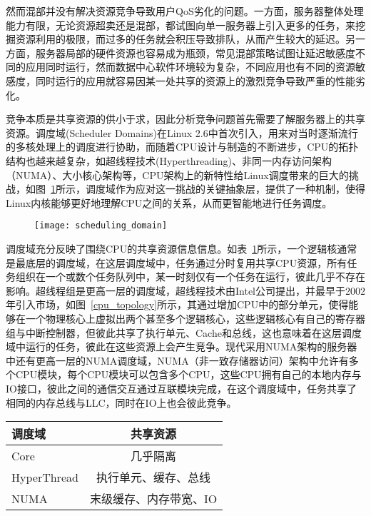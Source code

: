 然而混部并没有解决资源竞争导致用户QoS劣化的问题。一方面，服务器整体处理能力有限，无论资源超卖还是混部，都试图向单一服务器上引入更多的任务，来挖掘资源利用的极限，而过多的任务就会积压导致排队，从而产生较大的延迟。另一方面，服务器局部的硬件资源也容易成为瓶颈，常见混部策略试图让延迟敏感度不同的应用同时运行，然而数据中心软件环境较为复杂，不同应用也有不同的资源敏感度，同时运行的应用就容易因某一处共享的资源上的激烈竞争导致严重的性能劣化。

竞争本质是共享资源的供小于求，因此分析竞争问题首先需要了解服务器上的共享资源。调度域(Scheduler Domains)\citep{schedulerdomains}在Linux 2.6中首次引入，用来对当时逐渐流行的多核处理上的调度进行协助，而随着CPU设计与制造的不断进步，CPU的拓扑结构也越来越复杂，如超线程技术(Hyperthreading)、非同一内存访问架构（NUMA）、大小核心架构等，CPU架构上的新特性给Linux调度带来的巨大的挑战，如图~\ref{fig:scheduling_domain}所示，调度域作为应对这一挑战的关键抽象层，提供了一种机制，使得Linux内核能够更好地理解CPU之间的关系，从而更智能地进行任务调度。

\begin{figure}[!htbp]
    \centering
    \texttt{[image: scheduling\_domain]}
    \label{fig:scheduling_domain}
\end{figure}

调度域充分反映了围绕CPU的共享资源信息信息。如表~\ref{tab:resourcesharing}所示，一个逻辑核通常是最底层的调度域，在这层调度域中，任务通过分时复用共享CPU资源，所有任务组织在一个或数个任务队列中，某一时刻仅有一个任务在运行，彼此几乎不存在影响。超线程组是更高一层的调度域，超线程技术由Intel公司提出，并最早于2002年引入市场，如图~\ref{cpu_topology}所示，其通过增加CPU中的部分单元，使得能够在一个物理核心上虚拟出两个甚至多个逻辑核心，这些逻辑核心有自己的寄存器组与中断控制器，但彼此共享了执行单元、Cache和总线，这也意味着在这层调度域中运行的任务，彼此在这些资源上会产生竞争。现代采用NUMA架构的服务器中还有更高一层的NUMA调度域，NUMA（非一致存储器访问）架构中允许有多个CPU模块，每个CPU模块可以包含多个CPU，这些CPU拥有自己的本地内存与IO接口，彼此之间的通信交互通过互联模块完成，在这个调度域中，任务共享了相同的内存总线与LLC，同时在IO上也会彼此竞争。

\begin{table}
    \label{tab:resourcesharing}
    \footnotesize%
    \setlength{\tabcolsep}{4pt}%
    \renewcommand{\arraystretch}{1.5}%
    \centering
    \begin{tabular}{lc}
        \hline
        调度域 & 共享资源\\
        \hline
        Core & 几乎隔离\\
        HyperThread & 执行单元、缓存、总线\\
        NUMA & 末级缓存、内存带宽、IO\\
        \hline
    \end{tabular}
\end{table}


